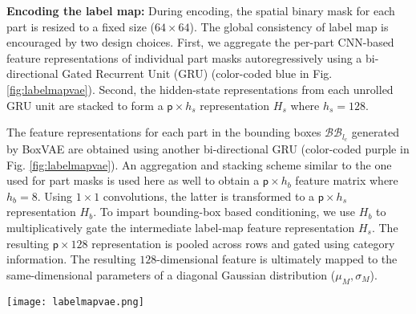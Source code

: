 \documentclass[runningheads]{llncs}
\begin{document}
\noindent \textbf{Encoding the label map:} During encoding, the spatial binary mask for each part is resized to a fixed size ($64 \times 64$). The global consistency of label map is encouraged by two design choices. First, we aggregate the per-part CNN-based feature representations of individual part masks autoregressively using a bi-directional Gated Recurrent Unit (GRU) (color-coded blue in Fig. \ref{fig:labelmapvae}). Second, the hidden-state representations from each unrolled GRU unit are stacked to form a $\mathsf{p} \times h_s$ representation $H_s$ where $h_s=128$.

The feature representations for each part in the bounding boxes $\mathcal{BB}_{l_c}$ generated by BoxVAE are obtained using another bi-directional GRU  (color-coded purple in Fig. \ref{fig:labelmapvae}). An aggregation and stacking scheme similar to the one used for part masks is used here as well to obtain a $\mathsf{p} \times h_b$ feature matrix where $h_b=8$. Using $1 \times 1$ convolutions, the latter is transformed to a $\mathsf{p} \times h_s$ representation $H_b$. To impart bounding-box based conditioning, we use $H_b$ to multiplicatively gate the intermediate label-map feature representation $H_s$. The resulting $\mathsf{p} \times 128$ representation is pooled across rows and gated using category information. The resulting $128$-dimensional feature is ultimately mapped to the same-dimensional parameters of a diagonal Gaussian distribution ($\mu_{M},\sigma_{M}$).

\begin{figure*}[!t]
  \centering
  \texttt{[image: labelmapvae.png]}
  \caption{The architecture for LabelMapVAE (Sec. \ref{sec:labelmapvae}) trained to generate per-pixel map for each part conditioned on object class and the part-labeled bounding box layout. After generation, the bounding boxes are used to compose the object in terms of appropriately re-scaled part masks. The pink arrows indicate the data flow for the generative model.}
  \label{fig:labelmapvae}
\end{figure*}
\end{document}
